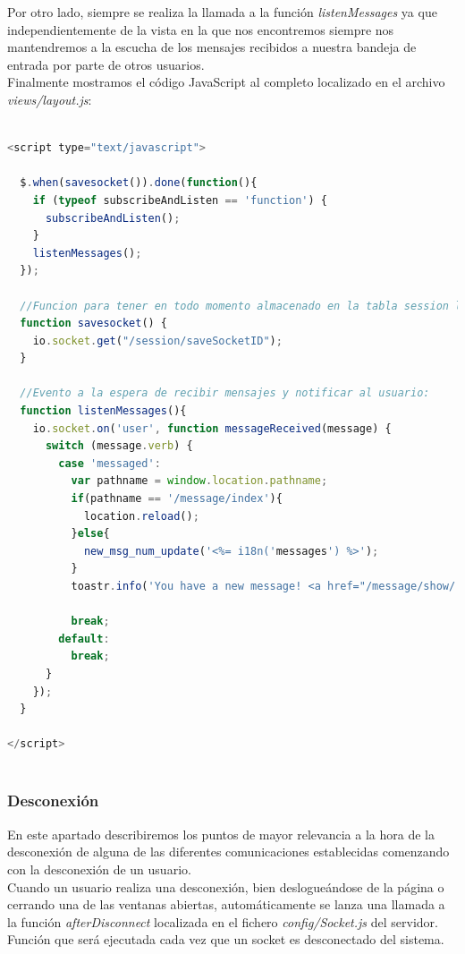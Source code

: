 Por otro lado, siempre se realiza la llamada a la función \emph{listenMessages} ya que independientemente de la vista en la que nos encontremos siempre nos mantendremos a la escucha de los mensajes 
recibidos a nuestra bandeja de entrada por parte de otros usuarios.\\

Finalmente mostramos el código JavaScript al completo localizado en el archivo \emph{views/layout.js}:\\


\begin{lstlisting}[language=JavaScript]

<script type="text/javascript">

  $.when(savesocket()).done(function(){
    if (typeof subscribeAndListen == 'function') {
      subscribeAndListen();
    }
    listenMessages();
  });

  //Funcion para tener en todo momento almacenado en la tabla session los sockets conectados junto con el usuario al que pertenece
  function savesocket() {
    io.socket.get("/session/saveSocketID");
  }

  //Evento a la espera de recibir mensajes y notificar al usuario:
  function listenMessages(){
    io.socket.on('user', function messageReceived(message) {
      switch (message.verb) {
        case 'messaged':
          var pathname = window.location.pathname;
          if(pathname == '/message/index'){
            location.reload();
          }else{
            new_msg_num_update('<%= i18n('messages') %>');
          }
          toastr.info('You have a new message! <a href="/message/show/' + message.data.msg.id + '"><%= i18n('open_here')%></a>' , 'Message');

          break;
        default:
          break;
      }
    });
  }

</script>
 
\end{lstlisting} 
 
\subsubsection { Desconexión }
\label{sec:deconexion}

En este apartado describiremos los puntos de mayor relevancia a la hora de la desconexión de alguna de las diferentes comunicaciones establecidas comenzando con la desconexión de un usuario.\\

Cuando un usuario realiza una desconexión, bien deslogueándose de la página o cerrando una de las ventanas abiertas, automáticamente se lanza una llamada a la 
función \emph{afterDisconnect} localizada en el fichero \emph{config/Socket.js} del servidor. Función que será ejecutada cada vez que un socket es desconectado del sistema.\\

